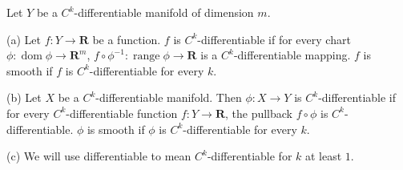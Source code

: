 Let $Y$ be a $C^k$-differentiable manifold of dimension $m$.

(a) Let $f: Y \to \mathbf{R}$ be a function. $f$ is $C^k$-differentiable if for every chart $\phi: \operatorname{dom}\phi \to \mathbf{R}^m$, $f \circ \phi^{-1}: \operatorname{range}\phi \to \mathbf{R}$ is a $C^k$-differentiable mapping. $f$ is smooth if $f$ is $C^k$-differentiable for every $k$.

(b) Let $X$ be a $C^k$-differentiable manifold. Then $\phi: X \to Y$ is $C^k$-differentiable if for every $C^k$-differentiable function $f: Y \to \mathbf{R}$, the pullback $f \circ \phi$ is $C^k$-differentiable. $\phi$ is smooth if $\phi$ is $C^k$-differentiable for every $k$.

(c) We will use differentiable to mean $C^k$-differentiable for $k$ at least $1$.
